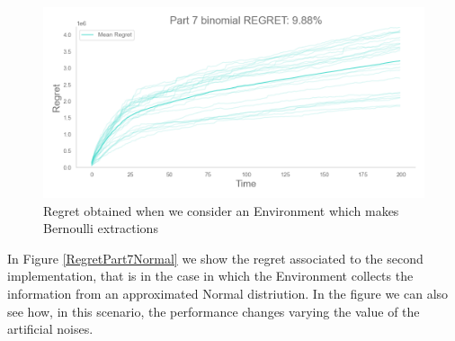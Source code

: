 \begin{figure}
    \includegraphics[width=\textwidth]{images/part7_binomial_regret.png}
    \caption{Regret obtained when we consider an Environment which makes Bernoulli extractions}
    \label{regretPart7Binomial}
\end{figure}

In Figure \ref{RegretPart7Normal} we show the regret associated to the second implementation, that is in the case in which the Environment collects the information from an approximated Normal distriution. In the figure we can also see how, in this scenario, the performance changes varying the value of the artificial noises.


